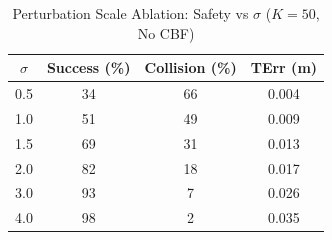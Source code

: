 \begin{table}[htbp]
\centering
\caption{Perturbation Scale Ablation: Safety vs $\sigma$ ($K=50$, No CBF)}
\label{tab:sigma_scaling}
\begin{tabular}{c|ccc}
\toprule
$\sigma$ & Success (\%) & Collision (\%) & TErr (m) \\
\midrule
  0.5 & 34 & 66 & 0.004 \\
  1.0 & 51 & 49 & 0.009 \\
  1.5 & 69 & 31 & 0.013 \\
  2.0 & 82 & 18 & 0.017 \\
  3.0 & 93 & 7 & 0.026 \\
  4.0 & 98 & 2 & 0.035 \\
\bottomrule
\end{tabular}
\end{table}
